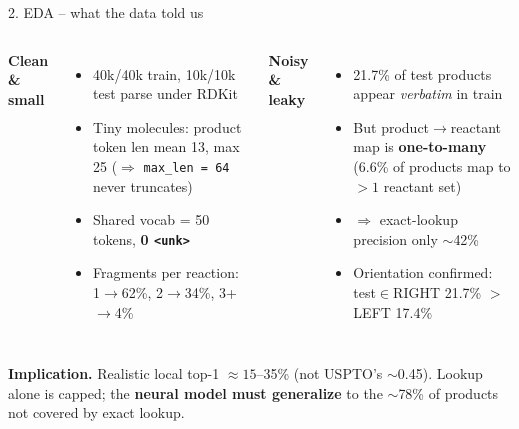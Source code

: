 \documentclass[aspectratio=169,11pt]{beamer}
\begin{document}
\begin{frame}{2. EDA -- what the data told us}
  \begin{columns}[T,onlytextwidth]
    \textbf{Clean \& small}
    \begin{itemize}
      \item 40k/40k train, 10k/10k test parse under RDKit
      \item Tiny molecules: product token len mean 13, max 25
        ($\Rightarrow$ \texttt{max\_len = 64} never truncates)
      \item Shared vocab = 50 tokens, \textbf{0 \texttt{<unk>}}
      \item Fragments per reaction: 1$\to$62\%, 2$\to$34\%, 3+$\to$4\%
    \end{itemize}

    \textbf{Noisy \& leaky}
    \begin{itemize}
      \item 21.7\% of test products appear \emph{verbatim} in train
      \item But product$\to$reactant map is \textbf{one-to-many}
        (6.6\% of products map to $>1$ reactant set)
      \item $\Rightarrow$ exact-lookup precision only $\sim$42\%
      \item Orientation confirmed: test$\in$RIGHT 21.7\% $>$ LEFT 17.4\%
    \end{itemize}
  \end{columns}

  \vspace{0.5em}
  \textbf{Implication.} Realistic local top-1 $\approx 15$--35\% (not USPTO's
  $\sim$0.45). Lookup alone is capped; the \textbf{neural model must generalize}
  to the $\sim$78\% of products not covered by exact lookup.
\end{frame}
\end{document}
